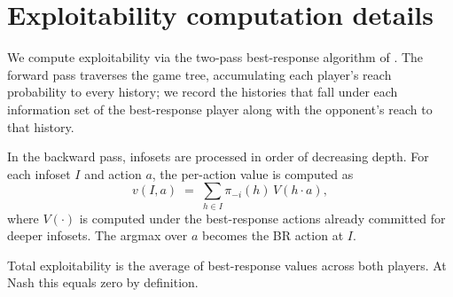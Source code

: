 \section{Exploitability computation details}
\label{app:exploitability}

We compute exploitability via the two-pass best-response algorithm of
\citet{johanson2011efficient}. The forward pass traverses the game tree,
accumulating each player's reach probability to every history; we record
the histories that fall under each information set of the best-response
player along with the opponent's reach to that history.

In the backward pass, infosets are processed in order of decreasing depth.
For each infoset $I$ and action $a$, the per-action value is computed as
\[
  v(I, a)
    \;=\; \sum_{h \in I} \pi_{-i}(h)\, V(h \cdot a),
\]
where $V(\cdot)$ is computed under the best-response actions already
committed for deeper infosets. The argmax over $a$ becomes the BR action at
$I$.

Total exploitability is the average of best-response values across both
players. At Nash this equals zero by definition.
